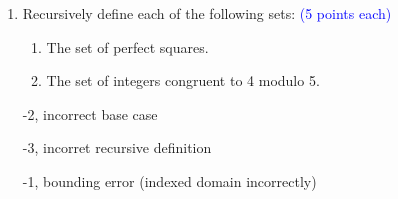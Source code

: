 \documentclass{article}
\newcommand{\pte}[1]{\textcolor{blue}{(#1 points each)}}
\newenvironment{rubric}
{
\par
\begin{spacing}{.6}
\begin{itshape}
\color{red}

}
{
\end{itshape}
\end{spacing}
\par
}
\begin{document}
\begin{enumerate}
\item Recursively define each of the following sets: \pte{5}
\begin{enumerate}
    \item The set of perfect squares.
    \item The set of integers congruent to 4 modulo 5.
\end{enumerate}

\begin{rubric}
-2, incorrect base case

-3, incorret recursive definition

-1, bounding error (indexed domain incorrectly)
\end{rubric}

\end{enumerate}
\end{document}
